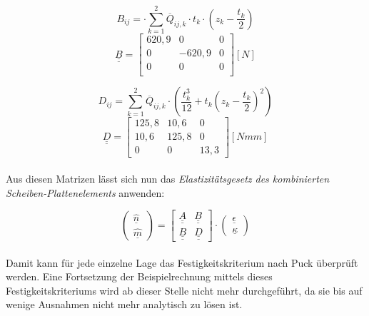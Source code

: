 \begin{equation}
	B_{ij}= \cdot \sum_{k=1}^{2} \overline{Q}_{ij,k}\cdot t_{k}\cdot \left(z_{k}-\frac{t_{k}}{2}\right)
\end{equation}
\begin{equation} \underline{\underline{B}}=
	\begin{bmatrix}
		620,9 & 0 & 0\\
		0 & -620,9 & 0\\	
		0 & 0 & 0\\
	\end{bmatrix} [N]
\end{equation}

\begin{equation} 
	D_{ij}=\sum_{k=1}^{2} \overline{Q}_{ij,k}\cdot \left(\frac{t_{k}^{3}}{12}+t_{k}\left(z_{k}-\frac{t_{k}}{2}\right)^{2}\right)
\end{equation}
\begin{equation}\underline{\underline{D}}=
	\begin{bmatrix}
		125,8 & 10,6 & 0\\
		10,6 & 125,8 & 0\\
		0 & 0 & 13,3
	\end{bmatrix} [Nmm]
\end{equation}\\

\noindent Aus diesen Matrizen lässt sich nun das \textit{ Elastizitätsgesetz des kombinierten Scheiben-Plattenelements} anwenden:

\begin{equation}
	\begin{pmatrix}
		\hat{\underline{n}}\\
		\hat{\underline{m}}
	\end{pmatrix}
	= \begin{bmatrix}
		\underline{\underline{A}}&\underline{\underline{B}}\\
		\underline{\underline{B}}&\underline{\underline{D}}
	\end{bmatrix}
	\cdot \begin{pmatrix}
		\underline{\epsilon}\\
		\underline{\kappa}
	\end{pmatrix}
\end{equation}\\

\noindent Damit kann für jede einzelne Lage das Festigkeitskriterium nach Puck überprüft werden. Eine Fortsetzung der Beispielrechnung mittels dieses Festigkeitskriteriums wird ab dieser Stelle nicht mehr durchgeführt, da sie bis auf wenige Ausnahmen nicht mehr analytisch zu lösen ist.\\

